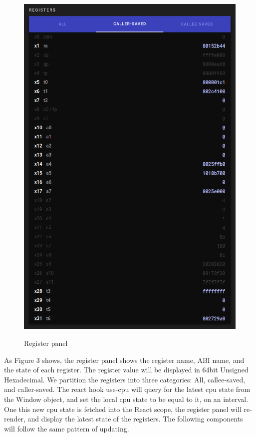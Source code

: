 \begin{figure}[H]
  \includegraphics[scale=.35]{reg}
  \label{fig:reg}
  \caption{Register panel}
  \centering
\end{figure}

\noindent

As Figure 3 shows, the register panel shows the register name, ABI name, and the state of
each register. The register value will be displayed in 64bit Unsigned Hexadecimal.
We partition the registers into three categories: All, callee-saved, and caller-saved.
The react hook use-cpu will query for the latest cpu state from the Window object, and set the local
cpu state to be equal to it, on an interval. One this new cpu state is fetched into the React scope,
the register panel will re-render, and display the latest state of the registers. The following components
will follow the same pattern of updating.

